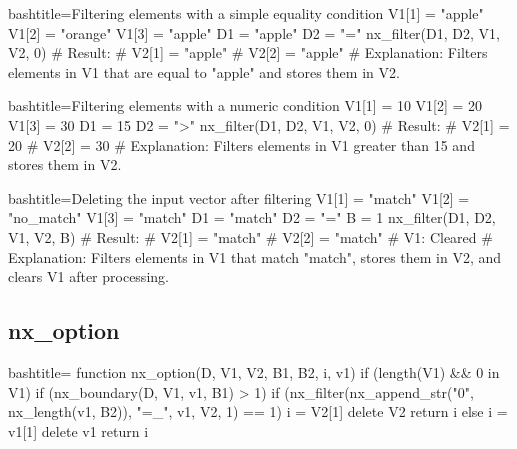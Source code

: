 \begin{NexCodeBox}{bash}{title={Filtering elements with a simple equality condition}}
	V1[1] = "apple"
	V1[2] = "orange"
	V1[3] = "apple"
	D1 = "apple"
	D2 = "="
	nx_filter(D1, D2, V1, V2, 0)
	# Result:
	# V2[1] = "apple"
	# V2[2] = "apple"
	# Explanation: Filters elements in V1 that are equal to "apple" and stores them in V2.
\end{NexCodeBox}

\begin{NexCodeBox}{bash}{title={Filtering elements with a numeric condition}}
	V1[1] = 10
	V1[2] = 20
	V1[3] = 30
	D1 = 15
	D2 = ">"
	nx_filter(D1, D2, V1, V2, 0)
	# Result:
	# V2[1] = 20
	# V2[2] = 30
	# Explanation: Filters elements in V1 greater than 15 and stores them in V2.
\end{NexCodeBox}

\begin{NexCodeBox}{bash}{title={Deleting the input vector after filtering}}
	V1[1] = "match"
	V1[2] = "no_match"
	V1[3] = "match"
	D1 = "match"
	D2 = "="
	B = 1
	nx_filter(D1, D2, V1, V2, B)
	# Result:
	# V2[1] = "match"
	# V2[2] = "match"
	# V1: Cleared
	# Explanation: Filters elements in V1 that match "match", stores them in V2, and clears V1 after processing.
\end{NexCodeBox}

\newpage
\subsection{nx_option}
\label{nx_option}
\begin{NexCodeBox}{bash}{title={}}
function nx_option(D, V1, V2, B1, B2,   i, v1)
{
	if (length(V1) && 0 in V1) {
		if (nx_boundary(D, V1, v1, B1) > 1) {
			if (nx_filter(nx_append_str("0", nx_length(v1, B2)), "=_", v1, V2, 1) == 1) {
				i = V2[1]
				delete V2
				return i
			}
		} else {
			i = v1[1]
			delete v1
			return i
		}
	}
}
\end{NexCodeBox}

